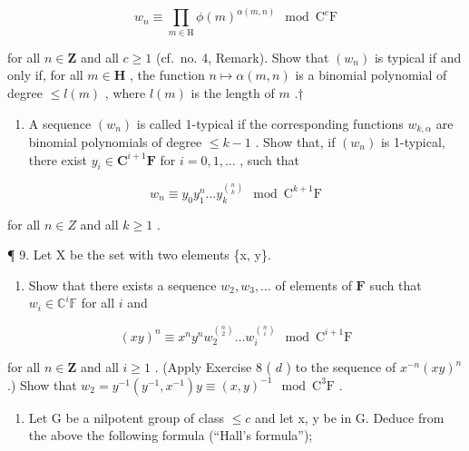 \[
w _ {n} \equiv \prod_ {m \in \mathrm{H}} \phi (m) ^ {\alpha (m, n)} \mod \mathrm{C} ^ {c} \mathrm{F}
\]

for all \(n \in \mathbf{Z}\) and all \(c \geqslant 1\) (cf.~no. 4, Remark). Show that \((w_n)\) is typical if and only if, for all \(m \in \mathbf{H}\) , the function \(n \mapsto \alpha(m, n)\) is a binomial polynomial of degree \(\leqslant l(m)\) , where \(l(m)\) is the length of \(m\) .†

\begin{enumerate}
\def\labelenumi{(\alph{enumi})}
\setcounter{enumi}{5}
\tightlist
\item
  A sequence \((w_{n})\) is called 1-typical if the corresponding functions \(w_{k,\alpha}\) are binomial polynomials of degree \(\leqslant k - 1\) . Show that, if \((w_{n})\) is 1-typical, there exist \(y_{i} \in \mathbf{C}^{i + 1}\mathbf{F}\) for \(i = 0, 1, \ldots\) , such that
\end{enumerate}

\[
w _ {n} \equiv y _ {0} y _ {1} ^ {n} \dots y _ {k} ^ {\binom {n} {k}} \mod \mathrm{C} ^ {k + 1} \mathrm{F}
\]

for all \(n \in Z\) and all \(k \geqslant 1\) .

¶ 9. Let X be the set with two elements \{x, y\}.

\begin{enumerate}
\def\labelenumi{(\alph{enumi})}
\tightlist
\item
  Show that there exists a sequence \(w_{2}, w_{3}, \ldots\) of elements of \(\mathbf{F}\) such that \(w_{i} \in \mathbb{C}^{i}\mathbb{F}\) for all \(i\) and
\end{enumerate}

\[
(x y) ^ {n} \equiv x ^ {n} y ^ {n} w _ {2} ^ {\binom {n} {2}} \dots w _ {i} ^ {\binom {n} {i}} \mod \mathrm{C} ^ {i + 1} \mathrm{F}
\]

for all \(n \in \mathbf{Z}\) and all \(i \geqslant 1\) . (Apply Exercise 8 ( \(d\) ) to the sequence of \(x^{-n}(xy)^n\) .) Show that \(w_2 = y^{-1}(y^{-1}, x^{-1})y \equiv (x, y)^{-1} \mod \mathrm{C}^3\mathrm{F}\) .

\begin{enumerate}
\def\labelenumi{(\alph{enumi})}
\setcounter{enumi}{1}
\tightlist
\item
  Let G be a nilpotent group of class \(\leqslant c\) and let x, y be in G. Deduce from the above the following formula (``Hall's formula'');
\end{enumerate}

